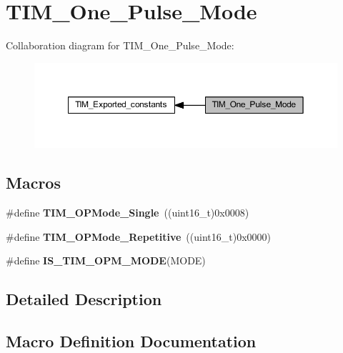 \hypertarget{group___t_i_m___one___pulse___mode}{}\section{T\+I\+M\+\_\+\+One\+\_\+\+Pulse\+\_\+\+Mode}
\label{group___t_i_m___one___pulse___mode}
Collaboration diagram for T\+I\+M\+\_\+\+One\+\_\+\+Pulse\+\_\+\+Mode\+:
\nopagebreak
\begin{figure}[H]
\begin{center}
\leavevmode
\includegraphics[width=350pt]{group___t_i_m___one___pulse___mode}
\end{center}
\end{figure}
\subsection*{Macros}
\begin{DoxyCompactItemize}
\item 
\mbox{\label{group___t_i_m___one___pulse___mode_ga99d934fdbc54ea4ee2cf5c86860f9227}} 
\#define {\bfseries T\+I\+M\+\_\+\+O\+P\+Mode\+\_\+\+Single}~((uint16\+\_\+t)0x0008)
\item 
\mbox{\label{group___t_i_m___one___pulse___mode_gad921d739c86bf48dca12442a81ad68ad}} 
\#define {\bfseries T\+I\+M\+\_\+\+O\+P\+Mode\+\_\+\+Repetitive}~((uint16\+\_\+t)0x0000)
\item 
\#define {\bfseries I\+S\+\_\+\+T\+I\+M\+\_\+\+O\+P\+M\+\_\+\+M\+O\+DE}(M\+O\+DE)
\end{DoxyCompactItemize}


\subsection{Detailed Description}


\subsection{Macro Definition Documentation}
\mbox{\label{group___t_i_m___one___pulse___mode_ga3f4a4305b4feacb4322eb4a358e54637}} 
